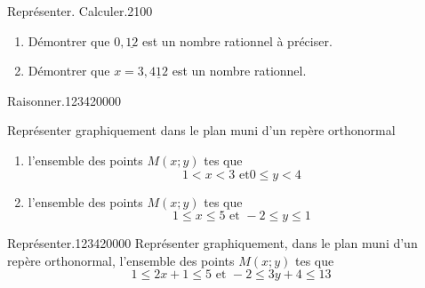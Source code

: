 \begin{pageParcourst}
\begin{ExoCtN}{Représenter. Calculer.}{2}{1}{0}{0} 

\begin{enumerate}
\item Démontrer que $0,\underline{12}$ est un nombre rationnel à préciser.
\item Démontrer que $x=3,\underline{412}$ est un nombre rationnel. 
\end{enumerate}
\end{ExoCtN} 
 

\begin{ExoCt}{Raisonner.}{1234}{2}{0}{0}{0}{0}
 
Représenter graphiquement dans le plan muni d'un repère orthonormal 
 
\begin{enumerate}
\item l'ensemble des points $M(x;y)$ tes que  $$1 < x < 3 \text{ et} 0 \leq y <4$$
\item l'ensemble des points $M(x;y)$ tes que  $$1 \leq  x \leq  5 \text{ et } -2 \leq y   \leq  1$$
\end{enumerate}
 
\end{ExoCt}


\begin{ExoCt}{Représenter.}{1234}{2}{0}{0}{0}{0}
Représenter graphiquement, dans le plan muni d'un repère orthonormal, l'ensemble des points $M(x;y)$ tes que  $$1 \leq  2x+1 \leq  5 \text{ et }  -2 \leq 3y + 4  \leq  13$$
\end{ExoCt} 
 

\end{pageParcourst}
 
